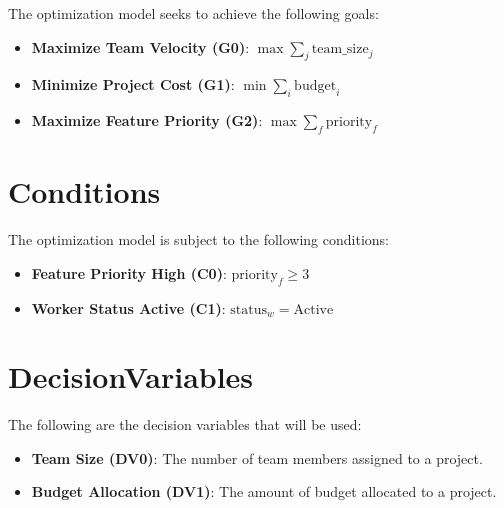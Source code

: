 \documentclass{article}
\begin{document}
The optimization model seeks to achieve the following goals:

\begin{itemize}
    \item \textbf{Maximize Team Velocity (G0)}: $\max \sum_{j} \text{team\_size}_j$
    \item \textbf{Minimize Project Cost (G1)}: $\min \sum_{i} \text{budget}_i$
    \item \textbf{Maximize Feature Priority (G2)}: $\max \sum_{f} \text{priority}_f$
\end{itemize}

\section{Conditions}

The optimization model is subject to the following conditions:

\begin{itemize}
    \item \textbf{Feature Priority High (C0)}: $\text{priority}_f \ge 3$
    \item \textbf{Worker Status Active (C1)}: $\text{status}_w = \text{Active}$
\end{itemize}

\section{DecisionVariables}

The following are the decision variables that will be used:

\begin{itemize}
    \item \textbf{Team Size (DV0)}: The number of team members assigned to a project.
    \item \textbf{Budget Allocation (DV1)}: The amount of budget allocated to a project.
\end{itemize}
\end{document}
